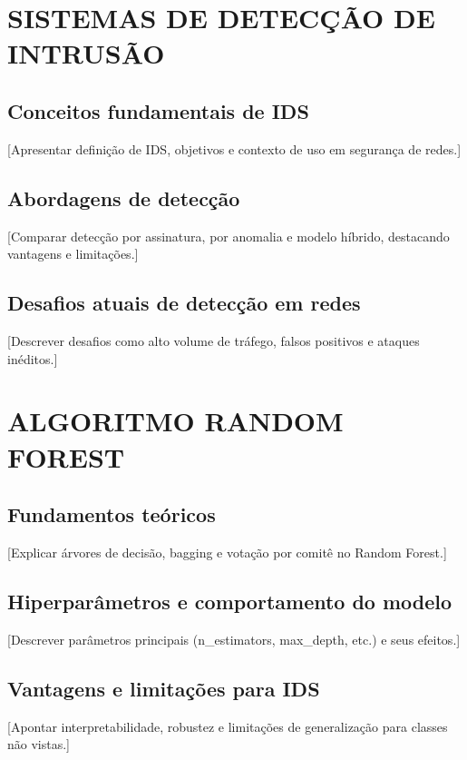 \documentclass[12pt,oneside]{abntex2}
\begin{document}
\chapter{SISTEMAS DE DETECÇÃO DE INTRUSÃO}

\section{Conceitos fundamentais de IDS}

[Apresentar definição de IDS, objetivos e contexto de uso em segurança de redes.]

\section{Abordagens de detecção}

[Comparar detecção por assinatura, por anomalia e modelo híbrido, destacando vantagens e limitações.]

\section{Desafios atuais de detecção em redes}

[Descrever desafios como alto volume de tráfego, falsos positivos e ataques inéditos.]

\chapter{ALGORITMO RANDOM FOREST}

\section{Fundamentos teóricos}

[Explicar árvores de decisão, bagging e votação por comitê no Random Forest.]

\section{Hiperparâmetros e comportamento do modelo}

[Descrever parâmetros principais (n\_estimators, max\_depth, etc.) e seus efeitos.] 

\section{Vantagens e limitações para IDS}

[Apontar interpretabilidade, robustez e limitações de generalização para classes não vistas.]
\end{document}
